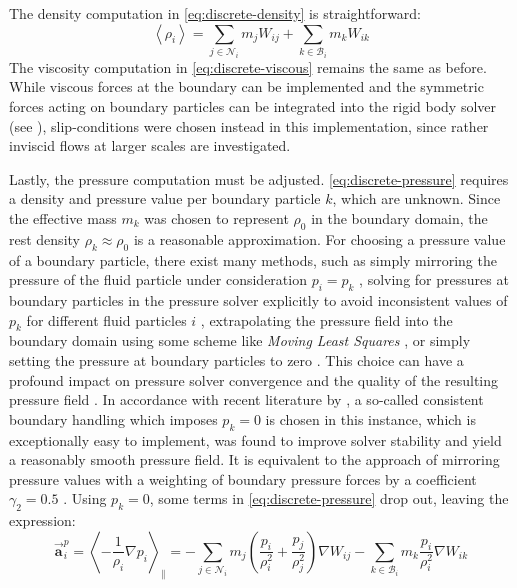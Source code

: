 \documentclass[oneside, a4paper]{book}
\newcommand\angled[1]{\left\langle#1\right\rangle}
\newcommand\vek[1]{\vec{\bm{#1}}}
\newcommand\br[1]{\left(#1\right)}
\begin{document}
    The density computation in \autoref{eq:discrete-density} is straightforward:
    \begin{equation}\label{eq:discrete-density-boundary}
      \angled{\rho_i} = \sum_{j\in\mathcal{N}_i} m_j W_{ij} + \sum_{k\in\mathcal{B}_i} m_k W_{ik}
    \end{equation}
    The viscosity computation in \autoref{eq:discrete-viscous} remains the same as before. While viscous forces at the boundary can be implemented and the symmetric forces acting on boundary particles can be integrated into the rigid body solver (see \autocite[Akinci et al.]{versatile-boundary-akinci}), slip-conditions were chosen instead in this implementation, since rather inviscid flows at larger scales are investigated.

    Lastly, the pressure computation must be adjusted. \autoref{eq:discrete-pressure} requires a density and pressure value per boundary particle $k$, which are unknown. Since the effective mass $m_k$ was chosen to represent $\rho_0$ in the boundary domain, the rest density $\rho_k\approx\rho_0$ is a reasonable approximation. For choosing a pressure value of a boundary particle, there exist many methods, such as simply mirroring the pressure of the fluid particle under consideration $p_i=p_k$ \autocite{versatile-boundary-akinci}, solving for pressures at boundary particles in the pressure solver explicitly to avoid inconsistent values of $p_k$ for different fluid particles $i$ \autocite{pressure-boundaries}{}, extrapolating the pressure field into the boundary domain using some scheme like \textit{Moving Least Squares} \autocite{mls-pressure-extrapolation}, or simply setting the pressure at boundary particles to zero \autocite{consistent-boundaries}. This choice can have a profound impact on pressure solver convergence and the quality of the resulting pressure field \autocite{consistent-boundaries}. In accordance with recent literature by \autocite[Bender et al.]{consistent-boundaries}, a so-called consistent boundary handling which imposes $p_k=0$ is chosen in this instance, which is exceptionally easy to implement, was found to improve solver stability and yield a reasonably smooth pressure field. It is equivalent to the approach of mirroring pressure values with a weighting of boundary pressure forces by a coefficient $\gamma_2=0.5$ \autocite{tutorial2019}. Using $p_k=0$, some terms in \autoref{eq:discrete-pressure} drop out, leaving the expression:
    \begin{equation}\label{eq:discrete-pressure-bdy}
      \vek{a}_i^p = \angled{-\frac{1}{\rho_i}\nabla p_i}_\parallel 
      = -\sum_{j\in\mathcal{N}_i} m_j \br{\frac{p_i}{\rho_i^2} + \frac{p_j}{\rho_j^2}} \nabla W_{ij} -\sum_{k\in\mathcal{B}_i} m_k\frac{p_i}{\rho_i^2} \nabla W_{ik}
    \end{equation}
\end{document}
